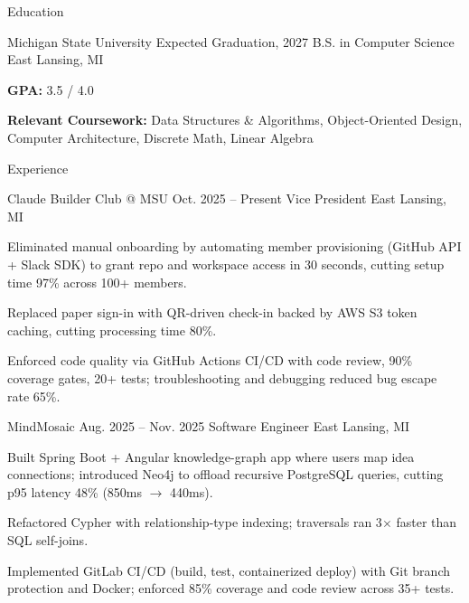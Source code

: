 \documentclass[
	11pt
]{../../../resume}
\begin{document}
	\begin{rSection}{E}{ducation}
		\begin{rSectionEntry}
			{Michigan State University}
			{Expected Graduation, 2027}
			{B.S. in Computer Science}
			{}
			{East Lansing, MI}

			\item \textbf{GPA:} 3.5 / 4.0
			\item \textbf{Relevant Coursework:} Data Structures \& Algorithms, Object-Oriented Design, Computer Architecture, Discrete Math, Linear Algebra
		\end{rSectionEntry}
	\end{rSection}

	\begin{rSection}{E}{xperience}
		\begin{rSectionEntry}
			{Claude Builder Club @ MSU}
			{Oct. 2025 -- Present}
			{Vice President}
			{}
			{East Lansing, MI}

			\item Eliminated manual onboarding by automating member provisioning (GitHub API + Slack SDK) to grant repo and workspace access in 30 seconds, cutting setup time 97\% across 100+ members.
			\item Replaced paper sign-in with QR-driven check-in backed by AWS S3 token caching, cutting processing time 80\%.
			\item Enforced code quality via GitHub Actions CI/CD with code review, 90\% coverage gates, 20+ tests; troubleshooting and debugging reduced bug escape rate 65\%.
		\end{rSectionEntry}

		\begin{rSectionEntry}
			{MindMosaic}
			{Aug. 2025 -- Nov. 2025}
			{Software Engineer}
			{}
			{East Lansing, MI}

			\item Built Spring Boot + Angular knowledge-graph app where users map idea connections; introduced Neo4j to offload recursive PostgreSQL queries, cutting p95 latency 48\% (850ms $\rightarrow$ 440ms).
			\item Refactored Cypher with relationship-type indexing; traversals ran 3$\times$ faster than SQL self-joins.
			\item Implemented GitLab CI/CD (build, test, containerized deploy) with Git branch protection and Docker; enforced 85\% coverage and code review across 35+ tests.
		\end{rSectionEntry}
	\end{rSection}
\end{document}
